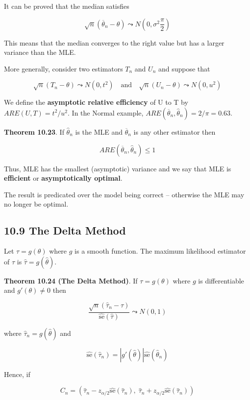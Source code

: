It can be proved that the median satisfies

\[ \sqrt{n}(\overline{\theta}_{n} - \theta) \leadsto N\left(0, \sigma^{2} \frac{\pi}{2} \right) \]

This means that the median converges to the right value but has a larger
variance than the MLE.

More generally, consider two estimators \(T_{n}\) and \(U_{n}\) and suppose
that

\[
\sqrt{n}(T_{n} - \theta) \leadsto N(0, t^{2}) 
\quad \text{and} \quad 
\sqrt{n}(U_{n} - \theta) \leadsto N(0, u^{2})
\]

We define the \textbf{asymptotic relative efficiency} of U to T by
\(ARE(U, T) = t^{2}/u^{2}\). In the Normal example,
\(ARE(\overline{\theta}_{n}, \hat{\theta}_{n}) = 2 / \pi = 0.63\).

\textbf{Theorem 10.23}. If \(\hat{\theta}_{n}\) is the MLE and
\(\overline{\theta}_{n}\) is any other estimator then

\[ ARE(\overline{\theta}_{n}, \hat{\theta}_{n}) \leq 1 \]

Thus, MLE has the smallest (asymptotic) variance and we say that MLE is
\textbf{efficient} or \textbf{asymptotically optimal}.

The result is predicated over the model being correct -- otherwise the
MLE may no longer be optimal.

\subsection*{10.9 The Delta Method}\label{delta:method}

Let \(\tau = g(\theta)\) where \(g\) is a smooth function. The maximum
likelihood estimator of \(\tau\) is \(\hat{\tau} = g(\hat{\theta})\).

\textbf{Theorem 10.24 (The Delta Method)}. If \(\tau = g(\theta)\) where
\(g\) is differentiable and \(g'(\theta) \neq 0\) then

\[ \frac{\sqrt{n}(\hat{\tau}_{n} - \tau)}{\hat{\text{se}}(\hat{\tau})} \leadsto N(0, 1) \]

where \(\hat{\tau}_{n} = g(\hat{\theta})\) and

\[ \hat{\text{se}}(\hat{\tau}_{n}) = |g'(\hat{\theta})| \hat{\text{se}} (\hat{\theta}_{n}) \]

Hence, if

\[ C_{n} = \left( \hat{\tau}_{n} - z_{\alpha/2} \hat{\text{se}}(\hat{\tau}_{n}), \; \hat{\tau}_{n} + z_{\alpha/2} \hat{\text{se}}(\hat{\tau}_{n}) \right) \]

